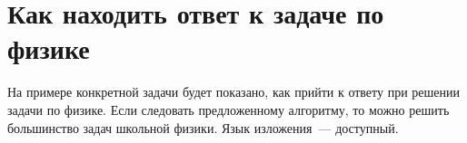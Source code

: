 \documentclass[main.tex]{subfiles}
\begin{document}

 


\setcounter{section}{22
}
\addtocounter{section}{-1} 

\section{Как находить ответ к задаче по физике}

На примере конкретной задачи будет показано, как прийти к ответу при решении задачи по физике. Если следовать предложенному алгоритму, то можно решить большинство задач школьной физики. Язык изложения~--- доступный. 

\bigskip
\end{document}
